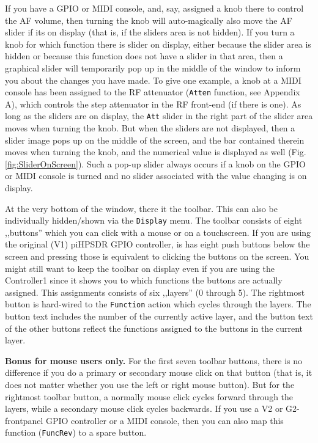 \documentclass[12pt]{book}
\def\rett#1{\texttt{\color{red}#1}}
\def\bltt#1{\texttt{\color{blue}#1}}
\begin{document}
If you have a GPIO or  MIDI  console, and, say, assigned
a knob there to control the AF volume, then turning the
knob will auto-magically also move the AF slider if its
on display (that is, if the sliders area is not hidden).
If you turn a knob for which function there is slider
on display, either because the slider area is hidden or
because this function does not have a slider in that area,
then a graphical slider will temporarily pop up in the
middle of the window to inform you about the changes
you have  made. To give one example, a knob at a
MIDI console has been assigned to the RF attenuator (\bltt{Atten}
function, see Appendix A), which controls the step
attenuator in the RF front-end (if there is one). As long
as the  sliders  are  on display, the \rett{Att} slider
in the right part of the slider area moves when turning
the knob. But when the sliders are not displayed, then a slider image
pops up  on the middle of the screen, and the
bar contained therein moves when turning the knob,
and the numerical value is displayed as well (Fig. \ref{fig:SliderOnScreen}).
Such a pop-up slider always occurs if a knob on the GPIO or MIDI
console is turned and no slider associated with the value changing is
on display.

At the very bottom of the window, there it the toolbar. This can also be
individually hidden/shown via the \bltt{Display} menu. The toolbar consists
of eight ,,buttons'' which you can click with a mouse or on a touchscreen.
If you are using the original (V1) piHPSDR GPIO controller, is has eight
push buttons below the screen and pressing those is equivalent to clicking
the buttons on the screen. You might still want to keep the toolbar on display
even if you are using the Controller1 since it shows you to which functions
the buttons are actually assigned. This assignments consists of six ,,layers''
(0 through 5). The rightmost button is hard-wired to the \bltt{Function}
action which cycles through the layers. The button text includes the
number of the currently active layer, and the button text of the other buttons
reflect the functions assigned to the buttons in the current layer.

\textbf{Bonus for mouse users only.} For the first seven toolbar buttons,
there is no difference if you do a primary or secondary mouse click on that
button (that is, it does not matter whether you use the left or right mouse
button). But for the rightmost toolbar button, a normally mouse click cycles
forward through the layers, while a secondary mouse click cycles backwards.
If you use a V2 or G2-frontpanel GPIO controller or a MIDI console, then you
can also map this function (\bltt{FuncRev}) to a spare button.
\end{document}
